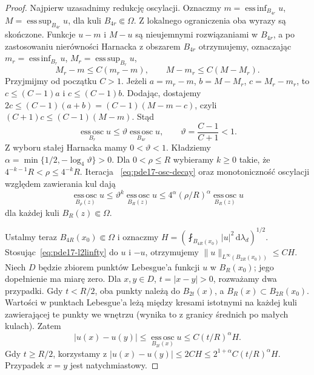 \begin{proof}
Najpierw uzasadnimy redukcję oscylacji. Oznaczmy
$m=\operatorname*{ess\,inf}_{B_{4r}}u$,
$M=\operatorname*{ess\,sup}_{B_{4r}}u$, dla kuli
$B_{4r}\Subset\Omega$. Z lokalnego ograniczenia
oba wyrazy są skończone. Funkcje $u-m$ i $M-u$ są
nieujemnymi rozwiązaniami w $B_{4r}$, a po zastosowaniu
nierówności Harnacka z obszarem $B_{4r}$ otrzymujemy,
oznaczając
$m_r=\operatorname*{ess\,inf}_{B_r}u$,
$M_r=\operatorname*{ess\,sup}_{B_r}u$,
\[
 M_r-m\le C(m_r-m),\qquad M-m_r\le C(M-M_r).
\]
Przyjmijmy od początku $C>1$. Jeżeli $a=m_r-m$,
$b=M-M_r$, $c=M_r-m_r$, to
$c\le(C-1)a$ i $c\le(C-1)b$. Dodając, dostajemy
$2c\le(C-1)(a+b)=(C-1)(M-m-c)$, czyli
$(C+1)c\le(C-1)(M-m)$. Stąd
\begin{equation}\label{eq:pde17-osc-decay}
 \operatorname*{ess\,osc}_{B_r}u
 \le\vartheta\operatorname*{ess\,osc}_{B_{4r}}u,
 \qquad \vartheta=\frac{C-1}{C+1}<1.
\end{equation}
Z wyboru stałej Harnacka mamy $0<\vartheta<1$. Kładziemy
$\alpha=\min\{1/2,-\log_4\vartheta\}>0$.
Dla $0<\rho\le R$ wybieramy $k\ge0$ takie, że
$4^{-k-1}R<\rho\le4^{-k}R$. Iteracja
~\eqref{eq:pde17-osc-decay} oraz monotoniczność oscylacji
względem zawierania kul dają
\[
 \operatorname*{ess\,osc}_{B_\rho(z)}u
 \le\vartheta^k\operatorname*{ess\,osc}_{B_R(z)}u
 \le4^\alpha(\rho/R)^\alpha
       \operatorname*{ess\,osc}_{B_R(z)}u
\]
dla każdej kuli $B_R(z)\Subset\Omega$.

Ustalmy teraz $B_{4R}(x_0)\Subset\Omega$ i oznaczmy
$H=(\fint_{B_{4R}(x_0)}|u|^2\,\mathrm d\lambda_d)^{1/2}$.
Stosując~\eqref{eq:pde17-l2linfty} do $u$ i $-u$,
otrzymujemy $\|u\|_{L^\infty(B_{2R}(x_0))}\le C H$.
Niech $D$ będzie zbiorem punktów Lebesgue'a funkcji $u$
w $B_R(x_0)$; jego dopełnienie ma miarę zero.
Dla $x,y\in D$, $t=|x-y|>0$, rozważamy dwa przypadki.
Gdy $t<R/2$, oba punkty należą do $B_{2t}(x)$, a
$B_R(x)\subset B_{2R}(x_0)$. Wartości w punktach Lebesgue'a
leżą między kresami istotnymi na każdej kuli zawierającej
te punkty we wnętrzu (wynika to z granicy średnich po
małych kulach). Zatem
\[
 |u(x)-u(y)|
 \le\operatorname*{ess\,osc}_{B_{2t}(x)}u
 \le C(t/R)^\alpha H.
\]
Gdy $t\ge R/2$, korzystamy z
$|u(x)-u(y)|\le2CH\le 2^{1+\alpha}C(t/R)^\alpha H$.
Przypadek $x=y$ jest natychmiastowy.


\end{proof}
